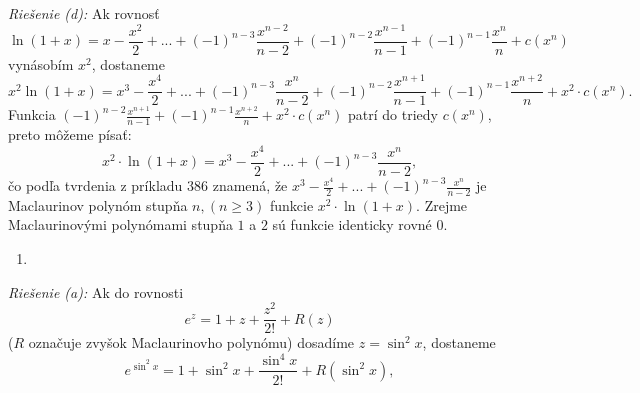 \textit{Riešenie (d):}
Ak rovnosť
$$\ln (1+x)=x-\frac{x^2}{2}+...+(-1)^{n-3}\frac{x^{n-2}}{n-2}+(-1)^{n-2}\frac{x^{n-1}}{n-1}+(-1)^{n-1}\frac{x^n}{n}+c(x^n)$$
 vynásobím $x^2$, dostaneme
 $$x^2\ln (1+x)=x^3-\frac{x^4}{2}+...+(-1)^{n-3}\frac{x^{n}}{n-2}+(-1)^{n-2}\frac{x^{n+1}}{n-1}+(-1)^{n-1}\frac{x^{n+2}}{n}+x^2\cdot c(x^n).$$
 Funkcia $(-1)^{n-2}\frac{x^{n+1}}{n-1}+(-1)^{n-1}\frac{x^{n+2}}{n}+x^2\cdot c(x^n)$ patrí do triedy $c(x^n)$, preto môžeme písať:
 $$x^2\cdot\ln (1+x)=x^3-\frac{x^4}{2}+...+(-1)^{n-3}\frac{x^n}{n-2},$$ čo podľa tvrdenia z príkladu $386$ znamená, že $x^3-\frac{x^4}{2}+...+(-1)^{n-3}\frac{x^n}{n-2}$ je Maclaurinov polynóm stupňa $n,(n\geq 3)$ funkcie $x^2\cdot\ln (1+x)$. Zrejme Maclaurinovými polynómami stupňa $1$ a $2$ sú funkcie identicky rovné $0$. 
 
 \begin{enumerate}[resume]
	\item {}
\end{enumerate}

\textit{Riešenie (a):}
Ak do rovnosti
$$e^z=1+z+\frac{z^2}{2!}+R(z)$$
($R$ označuje zvyšok Maclaurinovho polynómu) dosadíme $z=\sin^2 x$, dostaneme
$$e^{\sin^2 x}=1+\sin^2 x+\frac{\sin^4 x}{2!}+R(\sin^2 x),$$